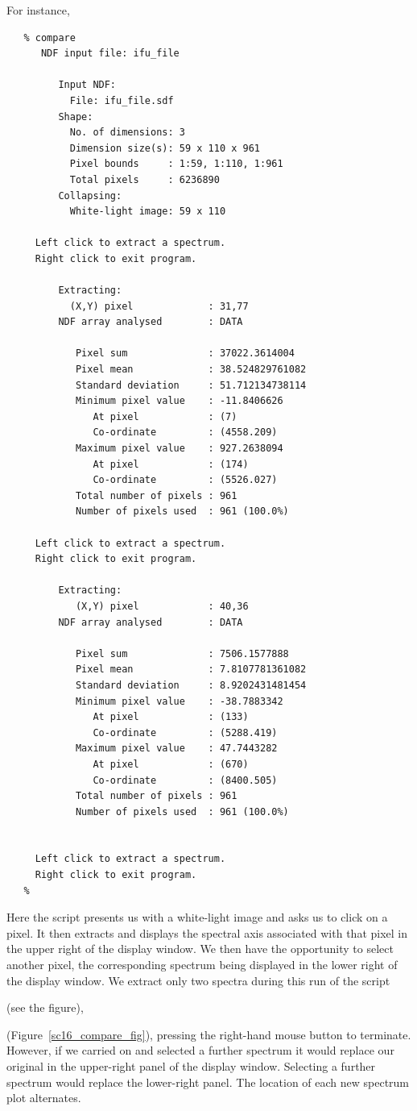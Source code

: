 \documentclass[twoside,11pt]{article}
\newcommand{\latex}[1]{#1}
\begin{document}
{For instance,

\small\begin{verbatim}
   % compare
      NDF input file: ifu_file
    
         Input NDF:
           File: ifu_file.sdf
         Shape:
           No. of dimensions: 3
           Dimension size(s): 59 x 110 x 961
           Pixel bounds     : 1:59, 1:110, 1:961
           Total pixels     : 6236890
         Collapsing:
           White-light image: 59 x 110
 
     Left click to extract a spectrum.
     Right click to exit program.
 
         Extracting:
           (X,Y) pixel             : 31,77
         NDF array analysed        : DATA

            Pixel sum              : 37022.3614004
            Pixel mean             : 38.524829761082
            Standard deviation     : 51.712134738114
            Minimum pixel value    : -11.8406626
               At pixel            : (7)
               Co-ordinate         : (4558.209)
            Maximum pixel value    : 927.2638094
               At pixel            : (174)
               Co-ordinate         : (5526.027)
            Total number of pixels : 961
            Number of pixels used  : 961 (100.0%)

     Left click to extract a spectrum.
     Right click to exit program.
 
         Extracting:
            (X,Y) pixel            : 40,36
         NDF array analysed        : DATA

            Pixel sum              : 7506.1577888
            Pixel mean             : 7.8107781361082
            Standard deviation     : 8.9202431481454
            Minimum pixel value    : -38.7883342
               At pixel            : (133)
               Co-ordinate         : (5288.419)
            Maximum pixel value    : 47.7443282
               At pixel            : (670)
               Co-ordinate         : (8400.505)
            Total number of pixels : 961
            Number of pixels used  : 961 (100.0%)


     Left click to extract a spectrum.
     Right click to exit program.
   %
\end{verbatim}\normalsize

Here the script presents us with a white-light image and asks us to
click on a pixel.  It then extracts and displays the spectral axis
associated with that pixel in the upper right of the display window.
We then have the opportunity to select another pixel, the
corresponding spectrum being displayed in the lower right of the
display window.  We extract only two spectra during this run of the
script 
\begin{htmlonly}
(see the figure),
\end{htmlonly}
\latex{(Figure~\ref{sc16_compare_fig}),} pressing the right-hand mouse
button to terminate.  However, if we carried on and selected a further
spectrum it would replace our original in the upper-right panel of the
display window.  Selecting a further spectrum would replace the
lower-right panel.  The location of each new spectrum plot alternates.

}
\end{document}

